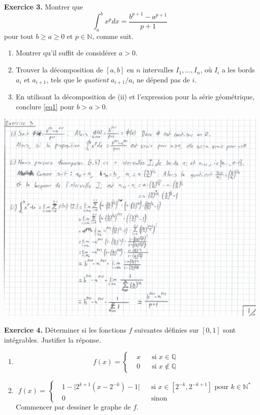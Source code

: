 \documentclass[a4paper, 10pt]{report}
\providecommand{\abs}[1]{\lvert#1\rvert}
\begin{document}
	\newpage
	
	\fancyhf{}
	\renewcommand{\headrule}
	{\rule{\textwidth}{0pt}}
	
	\noindent
	\textbf{Exercice 3.} Montrer que
	\begin{equation}\label{eq1}
	\int_{a}^{b}x^p dx = \frac{b^{p+1} - a^{p+1}}{p+1}
	\end{equation}
	pour tout $b \geq a \geq 0$ et $p \in \mathbb{N}$, comme suit.
	\begin{enumerate}[label=(\roman*)]
		\item Montrer qu'il suffit de considérer $a > 0$.
		\item Trouver la décomposition de $[a, b]$ en $n$ intervalles
		$I_1, \dotsc, I_n$, où $I_i$ a les bords $a_i$ et $a_{i+1}$,
		tels que le \textit{quotient} $a_{i+1}/a_i$ ne dépend pas de $i$.
		\item En utilisant la décomposition de (ii) et l'expression pour
		la série géométrique, conclure \eqref{eq1} pour $b > a > 0$.
	\end{enumerate}
	
	\includegraphics{ex03.jpg}
		
	\newpage
	
	\noindent
	\textbf{Exercice 4.} Déterminer si les fonctions $f$ suivantes
	définies sur $[0,1]$ sont intégrables. Justifier la réponse.
	\begin{enumerate}[label=(\roman*)]
		\item \[f(x) = \left\{\begin{aligned}
			&x &&\text{si } x \in \mathbb{Q}\\
			&0 &&\text{si } x \notin \mathbb{Q}
		\end{aligned}\right.\]
		\item \[f(x) = \left\{\begin{aligned}
			&1 - \abs{2^{k+1}(x - 2^{-k}) - 1}&& \text{si }
			x \in [2^{-k}, 2^{-k+1}] \text{ pour } k \in \mathbb{N}^*\\
			&0&& \text{sinon}
		\end{aligned}\right.\]
		Commencer par dessiner le graphe de $f$.
	\end{enumerate}
	
\end{document}
